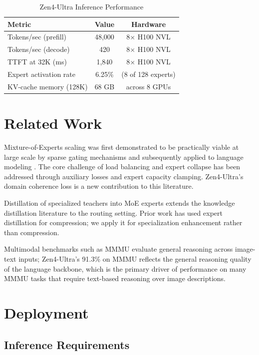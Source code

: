\documentclass[11pt,a4paper]{article}
\begin{document}
\begin{table}[H]
\centering
\begin{tabular}{lcc}
\toprule
\textbf{Metric} & \textbf{Value} & \textbf{Hardware} \\
\midrule
Tokens/sec (prefill)    & 48,000  & 8$\times$ H100 NVL \\
Tokens/sec (decode)     & 420     & 8$\times$ H100 NVL \\
TTFT at 32K (ms)        & 1,840   & 8$\times$ H100 NVL \\
Expert activation rate  & 6.25\%  & (8 of 128 experts) \\
KV-cache memory (128K)  & 68 GB   & across 8 GPUs \\
\bottomrule
\end{tabular}
\caption{Zen4-Ultra Inference Performance}
\end{table}

\section{Related Work}

Mixture-of-Experts scaling was first demonstrated to be practically viable at large scale
by sparse gating mechanisms \cite{shazeer2017outrageously} and subsequently applied to
language modeling \cite{fedus2022switch}. The core challenge of load balancing and
expert collapse has been addressed through auxiliary losses \cite{lepikhin2021gshard} and
expert capacity clamping. Zen4-Ultra's domain coherence loss is a new contribution to
this literature.

Distillation of specialized teachers into MoE experts extends the knowledge distillation
literature \cite{hinton2015distilling, romero2014fitnets} to the routing setting. Prior
work \cite{artetxe2021efficient} has used expert distillation for compression; we apply
it for specialization enhancement rather than compression.

Multimodal benchmarks such as MMMU \cite{yue2024mmmu} evaluate general reasoning across
image-text inputs; Zen4-Ultra's 91.3\% on MMMU reflects the general reasoning quality
of the language backbone, which is the primary driver of performance on many MMMU tasks
that require text-based reasoning over image descriptions.

\section{Deployment}

\subsection{Inference Requirements}
\end{document}
